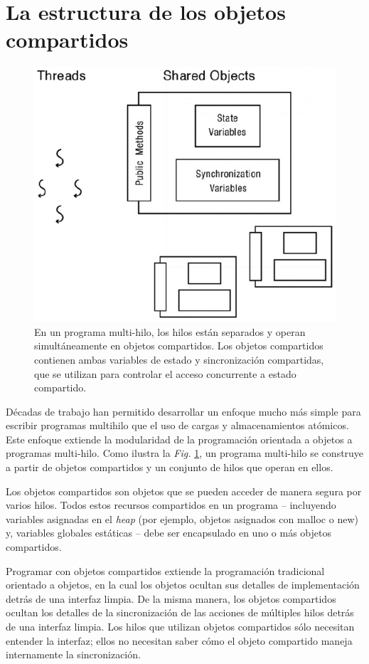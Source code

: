 \documentclass[10pt]{book}
\begin{document}
\section{La estructura de los objetos compartidos}
\begin{figure}[tbhp]
\centerline{\includegraphics[scale=0.45]{img/fig0501}}
\caption{En un programa multi-hilo, los hilos están separados y operan simultáneamente en objetos compartidos. Los objetos compartidos contienen ambas variables de estado y sincronización compartidas, que se utilizan para controlar el acceso concurrente a estado compartido.}
\label{fig0501}
\end{figure}

Décadas de trabajo han permitido desarrollar un enfoque mucho más simple para escribir programas multihilo que el uso de cargas y almacenamientos atómicos. Este enfoque extiende la modularidad de la programación orientada a objetos a programas multi-hilo. Como ilustra la \textit{Fig.} \ref{fig0501}, un programa multi-hilo se construye a partir de objetos compartidos y un conjunto de hilos que operan en ellos.

Los objetos compartidos son objetos que se pueden acceder de manera segura por varios hilos. Todos estos recursos compartidos en un programa -- incluyendo variables asignadas en el \textit{heap} (por ejemplo, objetos asignados con {\mf malloc} o {\mf new}) y, variables globales estáticas -- debe ser encapsulado en uno o más objetos compartidos.

Programar con objetos compartidos extiende la programación tradicional orientado a objetos, en la cual los objetos ocultan sus detalles de implementación detrás de una interfaz limpia. De la misma manera, los objetos compartidos ocultan los detalles de la sincronización de las acciones de múltiples hilos detrás de una interfaz limpia. Los hilos que utilizan objetos compartidos sólo necesitan entender la interfaz; ellos no necesitan saber cómo el objeto compartido maneja internamente la sincronización.
\end{document}
